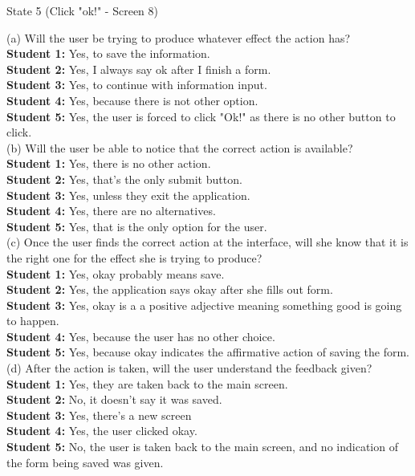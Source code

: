 \documentclass[pdftex,12pt,a4paper]{report}
\begin{document}
\begin{center}
{ \Large State 5 (Click "ok!" - Screen 8)}
\end{center}

\noindent(a) Will the user be trying to produce whatever effect the action has?
\\\indent \textbf{Student 1:} Yes, to save the information.
\\\indent \textbf{Student 2:} Yes, I always say ok after I finish a form.
\\\indent \textbf{Student 3:} Yes, to continue with information input.
\\\indent \textbf{Student 4:} Yes, because there is not other option.
\\\indent \textbf{Student 5:} Yes, the user is forced to click "Ok!" as there is no other button to click.
\\(b) Will the user be able to notice that the correct action is available?
\\\indent \textbf{Student 1:} Yes, there is no other action.
\\\indent \textbf{Student 2:} Yes, that's the only submit button.
\\\indent \textbf{Student 3:} Yes, unless they exit the application.
\\\indent \textbf{Student 4:} Yes, there are no alternatives.
\\\indent \textbf{Student 5:} Yes, that is the only option for the user.
\\(c) Once the user finds the correct action at the interface, will she know that it is the right one for the effect she is trying to produce?
\\\indent \textbf{Student 1:} Yes, okay probably means save.
\\\indent \textbf{Student 2:} Yes, the application says okay after she fills out form.
\\\indent \textbf{Student 3:} Yes, okay is a a positive adjective meaning something good is going to happen.
\\\indent \textbf{Student 4:} Yes, because the user has no other choice.
\\\indent \textbf{Student 5:} Yes, because okay indicates the affirmative action of saving the form.
\\(d) After the action is taken, will the user understand the feedback given?
\\\indent \textbf{Student 1:} Yes, they are taken back to the main screen.
\\\indent \textbf{Student 2:} No, it doesn't say it was saved.
\\\indent \textbf{Student 3:} Yes, there's a new screen
\\\indent \textbf{Student 4:} Yes, the user clicked okay.
\\\indent \textbf{Student 5:} No, the user is taken back to the main screen, and no indication of the form being saved was given.
\end{document}
